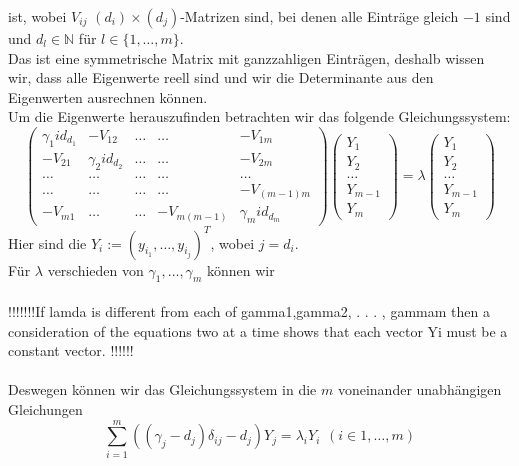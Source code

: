 ist, wobei $V_{ij}$ $(d_i)\times(d_j)$-Matrizen sind, bei denen alle Einträge gleich $-1$ sind und $d_l\in\mathbb{N}$ für $l\in \{1,\ldots,m\}$.\\
Das ist eine symmetrische Matrix mit ganzzahligen Einträgen, deshalb wissen wir, dass alle Eigenwerte reell sind und wir die Determinante aus den Eigenwerten ausrechnen können.\\
Um die Eigenwerte herauszufinden betrachten wir das folgende Gleichungssystem:
\begin{equation}
\begin{pmatrix}
 {\gamma_1}id_{d_1}&-V_{12}&\ldots&\ldots&-V_{1m}\\
 -V_{21}&{\gamma_2}id_{d_2}&\ldots&\ldots&-V_{2m}\\
 \ldots&\ldots&\ldots&\ldots&\ldots\\
  \ldots&\ldots&\ldots&\ldots&-V_{(m-1)m}\\
 -V_{m1}&\ldots&\ldots&-V_{m(m-1)}&{\gamma_m}id_{d_m}
\end{pmatrix}
\begin{pmatrix}
 Y_1\\
 Y_2\\
 \ldots\\
 Y_{m-1}\\
 Y_m
\end{pmatrix}
 =\lambda
 \begin{pmatrix}
 Y_1\\
 Y_2\\
 \ldots\\
 Y_{m-1}\\
 Y_m
\end{pmatrix}
\end{equation}
Hier sind die $Y_i:=(y_{i_1},\ldots,y_{i_j})^T$, wobei $j=d_i$.\\
Für $\lambda$ verschieden von $\gamma_1,\ldots,\gamma_m$ können wir\\ \\
!!!!!!!If lamda is different from each of gamma1,gamma2, . . . , gammam then a consideration of the
equations two at a time shows that each vector Yi must be a constant vector.
!!!!!! \\ \\
Deswegen können wir das Gleichungssystem in die $m$ voneinander unabhängigen Gleichungen 
\begin{equation}
 \sum_{i=1}^m((\gamma_j-d_j)\delta_{ij}-d_j)Y_j=\lambda_iY_i
  \hspace{5pt}(i\in{1,\ldots,m})
\end{equation}
